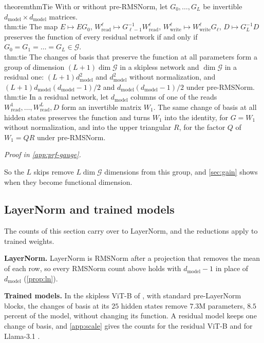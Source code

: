 \documentclass[10pt]{article}
\theoremstyle{definition}
\theoremstyle{remark}
\newcommand{\Wread}{W_{\mathrm{read}}}
\newcommand{\Wwrite}{W_{\mathrm{write}}}
\newcommand{\dm}{d_{\mathrm{model}}}
\newcommand{\G}{\mathcal{G}}
\newcommand{\para}[1]{\smallskip\noindent\textbf{#1}\hspace{0.5em}}
\newcommand{\ptlabel}[1]{\phantomsection\label{#1}}
\newcommand{\proofin}[1]{\par\vspace{-0.4\baselineskip}\noindent\hfill{\small\itshape Proof in \cref{#1}.}\par\smallskip}
\newcommand{\stpart}[3]{\ifx\relax#1\relax\else\ptlabel{#1:#2}\fi{\upshape\bfseries\boldmath(#2)\ifx\relax#3\relax\else\ #3.\fi}}
\begin{document}
\begin{restatable}{theorem}{thmTie}\label{thm:tie}
With or without pre-RMSNorm, let $G_0, \dots, G_L$ be invertible $\dm\times\dm$ matrices.\\
\stpart{thm:tie}{i}{} The map $E \mapsto EG_0$, $\Wread^{\ell} \mapsto G_{\ell-1}^{-1}\Wread^{\ell}$, $\Wwrite^{\ell} \mapsto \Wwrite^{\ell}G_\ell$, $D \mapsto G_L^{-1}D$ preserves the function of every residual network if and only if $G_0 = G_1 = \dots = G_L \in \G$.\\
\stpart{thm:tie}{ii}{} The changes of basis that preserve the function at all parameters form a group of dimension $(L+1)\dim\G$ in a skipless network and $\dim\G$ in a residual one: $(L+1)\dm^2$ and $\dm^2$ without normalization, and $(L+1)\dm(\dm-1)/2$ and $\dm(\dm-1)/2$ under pre-RMSNorm.\\
\stpart{thm:tie}{iii}{} In a residual network, let $\dm$ columns of one of the reads $\Wread^{1}, \dots, \Wread^{L}, D$ form an invertible matrix $W_1$. The same change of basis at all hidden states preserves the function and turns $W_1$ into the identity, for $G = W_1$ without normalization, and into the upper triangular $R$, for the factor $Q$ of $W_1 = QR$ under pre-RMSNorm.
\end{restatable}
\proofin{app:prf-gauge}

So the $L$ skips remove $L\dim\G$ dimensions from this group, and \cref{sec:gain} shows when they become functional dimension.

\subsection{LayerNorm and trained models}\label{sec:norm}

The counts of this section carry over to LayerNorm, and the reductions apply to trained weights.

\para{LayerNorm.} LayerNorm is RMSNorm after a projection that removes the mean of each row, so every RMSNorm count above holds with $\dm - 1$ in place of $\dm$ (\cref{prop:ln}).

\para{Trained models.}\label{sec:trained} In the skipless ViT-B \citep{dosovitskiy2021an} of \citet{ji2026cutting}, with standard pre-LayerNorm blocks, the changes of basis at its $25$ hidden states remove $7.3$M parameters, $8.5$ percent of the model, without changing its function. A residual model keeps one change of basis, and \cref{app:scale} gives the counts for the residual ViT-B and for Llama-3.1 \citep{grattafiori2024llama3}.
\end{document}
